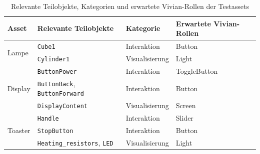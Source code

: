 \begin{table}[H]
  \centering
  \begin{tabularx}{\linewidth}{llll}
    \toprule
    Asset                    & Relevante Teilobjekte                       & Kategorie      & Erwartete Vivian-Rollen \\
    \midrule
    \multirow{2}{*}{Lampe}   & \texttt{Cube1}                              & Interaktion    & Button                  \\
                             & \texttt{Cylinder1}                          & Visualisierung & Light                   \\
    \midrule
    \multirow{3}{*}{Display} & \texttt{ButtonPower}                        & Interaktion    & ToggleButton            \\
                             & \texttt{ButtonBack}, \texttt{ButtonForward} & Interaktion    & Button                  \\
                             & \texttt{DisplayContent}                     & Visualisierung & Screen                  \\
    \midrule
    \multirow{3}{*}{Toaster} & \texttt{Handle}                             & Interaktion    & Slider                  \\
                             & \texttt{StopButton}                         & Interaktion    & Button                  \\
                             & \texttt{Heating\_resistors}, \texttt{LED}   & Visualisierung & Light                   \\
    \bottomrule
  \end{tabularx}
  \caption{Relevante Teilobjekte, Kategorien und erwartete Vivian-Rollen der Testassets}\label{tab:testassets_teilobjekte_kategorie_rollen}
\end{table}

\pagebreak

